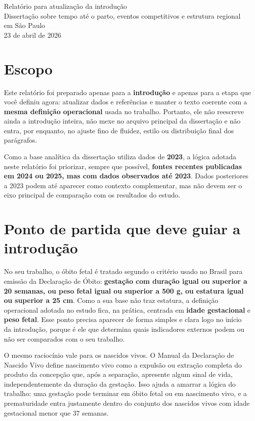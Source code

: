 \documentclass[12pt,a4paper]{article}
\begin{document}
\begin{center}
{\Large Relatório para atualização da introdução}\\[0.5em]
{\large Dissertação sobre tempo até o parto, eventos competitivos e estrutura regional em São Paulo}\\[1em]
23 de abril de 2026
\end{center}

\section*{Escopo}

Este relatório foi preparado apenas para a \textbf{introdução} e apenas para a etapa que você definiu agora: atualizar dados e referências e manter o texto coerente com a \textbf{mesma definição operacional} usada no trabalho. Portanto, ele não reescreve ainda a introdução inteira, não mexe no arquivo principal da dissertação e não entra, por enquanto, no ajuste fino de fluidez, estilo ou distribuição final dos parágrafos.

Como a base analítica da dissertação utiliza dados de \textbf{2023}, a lógica adotada neste relatório foi priorizar, sempre que possível, \textbf{fontes recentes publicadas em 2024 ou 2025, mas com dados observados até 2023}. Dados posteriores a 2023 podem até aparecer como contexto complementar, mas não devem ser o eixo principal de comparação com os resultados do estudo.

\section*{Ponto de partida que deve guiar a introdução}

No seu trabalho, o óbito fetal é tratado segundo o critério usado no Brasil para emissão da Declaração de Óbito: \textbf{gestação com duração igual ou superior a 20 semanas, ou peso fetal igual ou superior a 500 g, ou estatura igual ou superior a 25 cm}. Como a sua base não traz estatura, a definição operacional adotada no estudo fica, na prática, centrada em \textbf{idade gestacional} e \textbf{peso fetal}. Esse ponto precisa aparecer de forma simples e clara logo no início da introdução, porque é ele que determina quais indicadores externos podem ou não ser comparados com o seu trabalho.

O mesmo raciocínio vale para os nascidos vivos. O Manual da Declaração de Nascido Vivo define nascimento vivo como a expulsão ou extração completa do produto da concepção que, após a separação, apresente algum sinal de vida, independentemente da duração da gestação. Isso ajuda a amarrar a lógica do trabalho: uma gestação pode terminar em óbito fetal ou em nascimento vivo, e a prematuridade entra justamente dentro do conjunto dos nascidos vivos com idade gestacional menor que 37 semanas.
\end{document}
